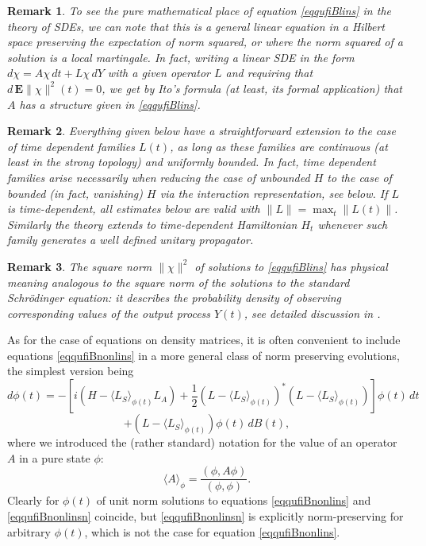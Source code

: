 \documentclass[12pt]{article}
\def\E{\mathbf{E}}
\newtheorem{remark}{Remark}
\begin{document}
\begin{remark}
To see the pure mathematical place of equation \eqref{eqqufiBlins} in the theory of SDEs, we can note that
this is a general linear equation in a Hilbert space preserving the expectation of norm squared,
or where the norm squared of a solution is a local martingale. In fact, writing a linear SDE in the form
$d\chi=A\chi \,dt +L\chi \, dY$ with a given operator $L$ and requiring that $d \, \E \|\chi\| ^2(t)=0$,
we get by Ito's formula (at least, its formal application) that $A$ has a structure given in \eqref{eqqufiBlins}.
\end{remark}

\begin{remark}
\label{remtimedep}
Everything given below have a straightforward extension to the case of time dependent families $L(t)$, as
long as these families are continuous (at least in the strong topology)
 and uniformly bounded. In fact, time dependent families arise necessarily
when reducing the case of unbounded $H$ to the case of bounded (in fact, vanishing) $H$ via the interaction
 representation, see below. If $L$ is time-dependent, all estimates below are valid with $\|L\|=\max_t\|L(t)\|$.
Similarly the theory extends to time-dependent Hamiltonian $H_t$ whenever such family generates a well defined
unitary propagator.
\end{remark}


\begin{remark} The square norm $\|\chi\|^2$ of solutions to \eqref{eqqufiBlins} has physical meaning
analogous to the square norm of the solutions to the standard Schr\"odinger equation:
it describes the probability density of observing corresponding values of the output process $Y(t)$,
see detailed discussion in  \cite{BarchBook}.
\end{remark}


As for the case of equations on density matrices,
it is often convenient
to include equations \eqref{eqqufiBnonlins}
in a more general class of norm preserving evolutions, the simplest version being
\[
d\phi(t)=-[i(H-\langle L_S \rangle_{\phi(t)} L_A)
+\frac12 (L-\langle L_S \rangle_{\phi(t)})^*(L-\langle L_S \rangle_{\phi(t)})]\phi(t) \, dt
\]
\begin{equation}
\label{eqqufiBnonlinsn}
+ (L-\langle L_S \rangle_{\phi(t)})\phi(t) \, dB(t),
\end{equation}
where we introduced the (rather standard) notation for the value
of an operator $A$ in a pure state $\phi$:
\[
\langle A \rangle_{\phi}=\frac{(\phi, A \phi)}{(\phi, \phi)}.
\]
Clearly for $\phi(t)$ of unit norm solutions to equations \eqref{eqqufiBnonlins}
and \eqref{eqqufiBnonlinsn} coincide, but \eqref{eqqufiBnonlinsn} is explicitly norm-preserving
for arbitrary $\phi(t)$, which is not the case for equation \eqref{eqqufiBnonlins}.
\end{document}
